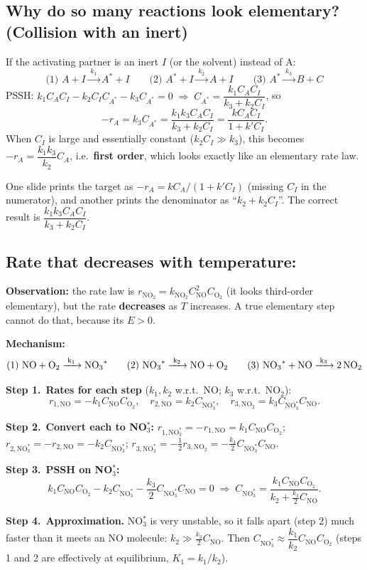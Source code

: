 \documentclass[11pt]{article}
\newcommand{\step}[1]{\par\smallskip\textcolor{stepgray}{\textbf{Step #1.}}\ }
\newcommand{\rxn}[1]{\xrightarrow{\;#1\;}}
\begin{document}
\subsection{Why do so many reactions look elementary? (Collision with an inert)}
If the activating partner is an inert $I$ (or the solvent) instead of A:
\[
\text{(1) } A+I\rxn{k_1}A^*+I\qquad
\text{(2) } A^*+I\rxn{k_2}A+I\qquad
\text{(3) } A^*\rxn{k_3}B+C
\]
PSSH: $k_1C_AC_I-k_2C_IC_{A^*}-k_3C_{A^*}=0\;\Rightarrow\;C_{A^*}=\dfrac{k_1C_AC_I}{k_3+k_2C_I}$, so
\[
-r_A=k_3C_{A^*}=\frac{k_1k_3C_AC_I}{k_3+k_2C_I}=\frac{kC_AC_I}{1+k'C_I}.
\]
When $C_I$ is large and essentially constant ($k_2C_I\gg k_3$), this becomes $-r_A=\dfrac{k_1k_3}{k_2}C_A$, i.e.\ \textbf{first order},
which looks exactly like an elementary rate law.
\begin{mistake}
One slide prints the target as $-r_A=kC_A/(1+k'C_I)$ (missing $C_I$ in the numerator), and another prints the
denominator as ``$k_2+k_2C_I$''. The correct result is $\dfrac{k_1k_3C_AC_I}{k_3+k_2C_I}$.
\end{mistake}

\subsection{Rate that decreases with temperature: }
\textbf{Observation:} the rate law is $r_{\mathrm{NO_2}}=k_{\mathrm{NO_2}}C_{\mathrm{NO}}^2C_{\mathrm{O_2}}$ (it looks
third-order elementary), but the rate \textbf{decreases} as $T$ increases. A true elementary step cannot do that,
because its $E>0$.

\textbf{Mechanism:}
\[
\text{(1) }\ce{NO + O2 ->[k_1] NO3^*}\qquad
\text{(2) }\ce{NO3^* ->[k_2] NO + O2}\qquad
\text{(3) }\ce{NO3^* + NO ->[k_3] 2NO2}
\]
\step{1}\textbf{Rates for each step} ($k_1,k_2$ w.r.t.\ NO; $k_3$ w.r.t.\ NO$_2$):
\[
r_{1,\mathrm{NO}}=-k_1C_{\mathrm{NO}}C_{\mathrm{O_2}},\quad
r_{2,\mathrm{NO}}=k_2C_{\mathrm{NO_3^*}},\quad
r_{3,\mathrm{NO_2}}=k_3C_{\mathrm{NO_3^*}}C_{\mathrm{NO}}.
\]
\step{2}\textbf{Convert each to NO$_3^*$:}
$r_{1,\mathrm{NO_3^*}}=-r_{1,\mathrm{NO}}=k_1C_{\mathrm{NO}}C_{\mathrm{O_2}}$;\;
$r_{2,\mathrm{NO_3^*}}=-r_{2,\mathrm{NO}}=-k_2C_{\mathrm{NO_3^*}}$;\;
$r_{3,\mathrm{NO_3^*}}=-\tfrac12r_{3,\mathrm{NO_2}}=-\tfrac{k_3}{2}C_{\mathrm{NO_3^*}}C_{\mathrm{NO}}$.

\step{3}\textbf{PSSH on NO$_3^*$:}
\[
k_1C_{\mathrm{NO}}C_{\mathrm{O_2}}-k_2C_{\mathrm{NO_3^*}}-\frac{k_3}{2}C_{\mathrm{NO_3^*}}C_{\mathrm{NO}}=0
\;\Rightarrow\;
C_{\mathrm{NO_3^*}}=\frac{k_1C_{\mathrm{NO}}C_{\mathrm{O_2}}}{k_2+\frac{k_3}{2}C_{\mathrm{NO}}}.
\]
\step{4}\textbf{Approximation.} NO$_3^*$ is very unstable, so it falls apart (step 2) much faster than it meets an NO
molecule: $k_2\gg\frac{k_3}{2}C_{\mathrm{NO}}$. Then $C_{\mathrm{NO_3^*}}\approx\dfrac{k_1}{k_2}C_{\mathrm{NO}}C_{\mathrm{O_2}}$
(steps 1 and 2 are effectively at equilibrium, $K_1=k_1/k_2$).
\end{document}

